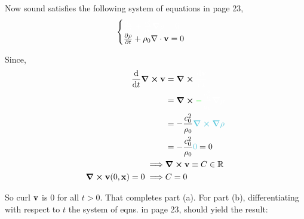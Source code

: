 \documentclass{article}
\newcommand\R{\mathbb{R}}
\begin{document}
Now sound satisfies the following system of equations in page 23,
\[\begin{cases}\color{White} \pdv{\vb{v}}{t} + \frac{c_0^2}{\rho_0}\grad{\rho} = 0\\
    \pdv{\rho}{t} +\rho_0\nabla\cdot \vb{v} = 0\end{cases}\]

Since,
\begin{align*}
  \dv{t}\curl{\vb{v}}
  &=\curl{\color{White}\dv{\vb{v}}{t}}\\
  &=
    \curl{\color{green}-\color{White}\frac{c_0^2}{\rho_0}\grad{\rho}}\\
  &= -\frac{c_0^2}{\rho_0}{\color{SkyBlue}\curl{\grad{\rho}}}\\
  &= -\frac{c_0^2}{\rho_0}{\color{SkyBlue}0} = 0\\
  \implies &\curl{\vb{v}} \equiv C\in \R\\
 \curl{\vb{v}(0,\vb{x})} = 0\implies & C = 0
\end{align*}

So curl $\vb{v}$ is $0$ for all $t>0.$ That completes part (a).
\newpage
For part (b), differentiating with respect to $t$ the system of
eqns. in page 23, should yield the result:
\end{document}
